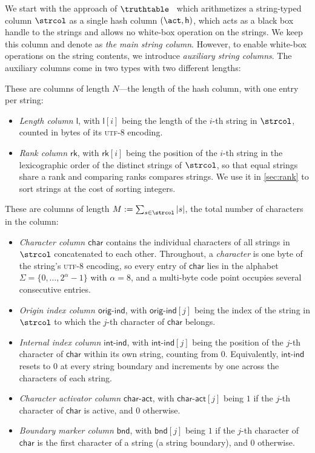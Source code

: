 We start with the approach of $\truthtable$~\cite{cryptoeprint:2026/1260} which arithmetizes a string-typed column $\strcol$ as a single hash column $(\act,\mathsf{h})$, which acts as a black box handle to the strings and allows no white-box operation on the strings. We keep this column and denote as \emph{the main string column}. However, to enable white-box operations on the string contents, we introduce \emph{auxiliary string columns}. The auxiliary columns come in two types with two different lengths:

 These are columns of length $N$---the length of the hash column, with one entry per string:
\begin{itemize}[nosep]
    \item \emph{Length column $\mathsf{l}$}, with $\mathsf{l}[i]$ being the length of the $i$-th string in $\strcol$, counted in bytes of its \textsc{utf-8} encoding.
    \item \emph{Rank column $\mathsf{rk}$}, with $\mathsf{rk}[i]$ being the position of the $i$-th string in the lexicographic order of the distinct strings of $\strcol$, so that equal strings share a rank and comparing ranks compares strings. We use it in \cref{sec:rank} to sort strings at the cost of sorting integers.
    \end{itemize}
     These are columns of length $M := \sum_{s \in \strcol} |s|$, the total number of characters in the column:
   \begin{itemize}[nosep]
    \item \emph{Character column $\mathsf{char}$} contains the individual characters of all strings in $\strcol$ concatenated to each other. Throughout, a \emph{character} is one byte of the string's \textsc{utf-8} encoding, so every entry of $\mathsf{char}$ lies in the alphabet $\Sigma = \{0, \dots, 2^{\alpha}-1\}$ with $\alpha = 8$, and a multi-byte code point occupies several consecutive entries.
    \item \emph{Origin index column $\mathsf{orig\text{-}ind}$}, with $\mathsf{orig\text{-}ind}[j]$ being the index of the string in $\strcol$ to which the $j$-th character of $\mathsf{char}$ belongs.
    \item \emph{Internal index column $\mathsf{int\text{-}ind}$}, with $\mathsf{int\text{-}ind}[j]$ being the position of the $j$-th character of $\mathsf{char}$ within its own string, counting from $0$. Equivalently, $\mathsf{int\text{-}ind}$ resets to $0$ at every string boundary and increments by one across the characters of each string.
    \item \emph{Character activator column $\mathsf{char\text{-}act}$}, with $\mathsf{char\text{-}act}[j]$ being $1$ if the $j$-th character of $\mathsf{char}$ is active, and $0$ otherwise.
    \item \emph{Boundary marker column $\mathsf{bnd}$}, with $\mathsf{bnd}[j]$ being $1$ if the $j$-th character of $\mathsf{char}$ is the first character of a string (a string boundary), and $0$ otherwise. 
    \end{itemize}
